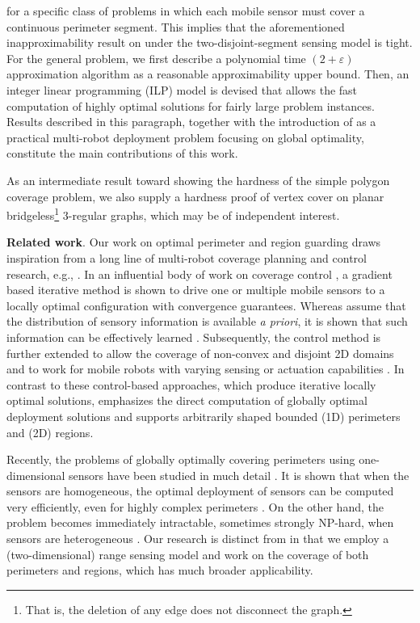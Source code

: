 for a specific class of \opgt problems in which each mobile 
sensor must cover a continuous perimeter segment. This implies that the 
aforementioned inapproximability result on \opgt under the 
two-disjoint-segment sensing model is tight. 
%
For the general \osgt problem, we first describe a polynomial time 
$(2+\varepsilon)$ approximation algorithm as a reasonable approximability 
upper bound. 
%
Then, an integer linear programming (ILP) model is devised that allows 
the fast computation of highly optimal solutions for fairly large 
problem instances. 
%
Results described in this paragraph, together with the introduction 
of \osgt as a practical multi-robot deployment problem focusing on global 
optimality, constitute the main contributions of this work. 

As an intermediate result toward showing the hardness of the simple polygon
coverage problem, we also supply a hardness proof of vertex cover 
on planar bridgeless\footnote{That is, the deletion of any edge does not disconnect 
the graph.} $3$-regular graphs, which may be of independent interest. 

\textbf{Related work}. Our work on optimal perimeter and region guarding 
draws inspiration from a long line of multi-robot coverage planning and 
control research, e.g., \cite{cortes2004coverage,martinez2007motion,
schwager2009optimal,pavone2009equitable,schwager2009decentralized,
pierson2017adapting}. 
%
In an influential body of work on coverage control \cite{cortes2004coverage,
martinez2007motion}, a gradient based iterative method is shown to drive 
one or multiple mobile sensors to a locally optimal configuration with 
convergence guarantees. 
%
Whereas \cite{cortes2004coverage,martinez2007motion} assume that the 
distribution of sensory information is available {\em a priori}, it is 
shown that such information can be effectively learned 
\cite{schwager2009decentralized}. 
%
Subsequently, the control method is further extended to allow the 
coverage of non-convex and disjoint 2D domains \cite{schwager2009optimal} 
and to work for mobile robots with varying sensing or actuation capabilities
\cite{pierson2017adapting}. 
%
In contrast to these control-based approaches, which produce iterative 
locally optimal solutions, \osgt emphasizes the direct computation of 
globally optimal deployment solutions and supports arbitrarily shaped
bounded (1D) perimeters and (2D) regions.

Recently, the problems of globally optimally covering perimeters using 
one-dimensional sensors have been studied in much detail 
\cite{FenHanGaoYuRSS19,FenYu2020RAL}. It is shown that when the sensors 
are homogeneous, the optimal deployment of sensors can be computed 
very efficiently, even for highly complex perimeters \cite{FenHanGaoYuRSS19}.
On the other hand, the problem becomes immediately intractable, sometimes
strongly NP-hard, when sensors are heterogeneous \cite{FenYu2020RAL}. 
Our research is distinct from \cite{FenHanGaoYuRSS19,FenYu2020RAL} in that 
we employ a (two-dimensional) range sensing model and work on the coverage 
of both perimeters and regions, which has much broader applicability. 

